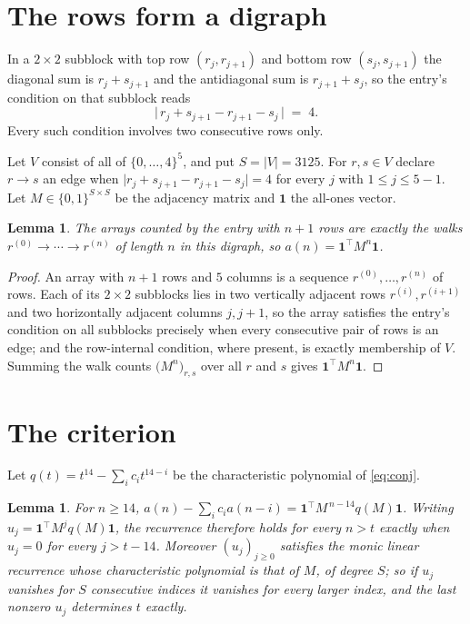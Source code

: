 \documentclass[11pt,a4paper]{article}
\theoremstyle{plain}
\newtheorem{lemma}[theorem]{Lemma}
\theoremstyle{definition}
\begin{document}
\section{The rows form a digraph}

In a $2\times2$ subblock with top row $(r_j,r_{j+1})$ and bottom row $(s_j,s_{j+1})$ the
diagonal sum is $r_j+s_{j+1}$ and the antidiagonal sum is $r_{j+1}+s_j$, so the entry's
condition on that subblock reads
\[
\bigl|\,r_j+s_{j+1}-r_{j+1}-s_j\,\bigr|\;=\;4.
\]
Every such condition involves two consecutive rows only.

Let $V$ consist of all of $\{0,\dots,4\}^{5}$, and put $S=|V|=3125$. For $r,s\in V$ declare $r\to s$ an edge
when $\bigl|r_j+s_{j+1}-r_{j+1}-s_j\bigr|=4$ for every $j$ with
$1\le j\le5-1$. Let $M\in\{0,1\}^{S\times S}$ be the adjacency matrix and $\mathbf{1}$
the all-ones vector.

\begin{lemma}\label{lem:walk}
The arrays counted by the entry with $n+1$ rows are exactly the walks
$r^{(0)}\to\cdots\to r^{(n)}$ of length $n$ in this digraph, so
$a(n)=\mathbf{1}^{\!\top}M^{n}\mathbf{1}$.
\end{lemma}

\begin{proof}
An array with $n+1$ rows and $5$ columns is a sequence $r^{(0)},\dots,r^{(n)}$ of
rows. Each of its $2\times2$ subblocks lies in two vertically adjacent rows
$r^{(i)},r^{(i+1)}$ and two horizontally adjacent columns $j,j+1$, so the array satisfies
the entry's condition on all subblocks precisely when every consecutive pair of rows is an
edge; and the row-internal condition, where present, is exactly membership of $V$. Summing
the walk counts $\bigl(M^{n}\bigr)_{r,s}$ over all $r$ and $s$ gives
$\mathbf{1}^{\!\top}M^{n}\mathbf{1}$.
\end{proof}

\section{The criterion}

Let $q(t)=t^{14}-\sum_i c_i t^{14-i}$ be the characteristic polynomial of
\eqref{eq:conj}.

\begin{lemma}\label{lem:crit}
For $n\ge14$,
$a(n)-\sum_i c_i a(n-i)=\mathbf{1}^{\!\top}M^{\,n-14}q(M)\mathbf{1}$. Writing
$u_j=\mathbf{1}^{\!\top}M^{j}q(M)\mathbf{1}$, the recurrence therefore holds for every
$n>t$ exactly when $u_j=0$ for every $j>t-14$. Moreover $(u_j)_{j\ge0}$ satisfies the
monic linear recurrence whose characteristic polynomial is that of $M$, of degree $S$; so
if $u_j$ vanishes for $S$ consecutive indices it vanishes for every larger index, and the
last nonzero $u_j$ determines $t$ exactly.
\end{lemma}
\end{document}
